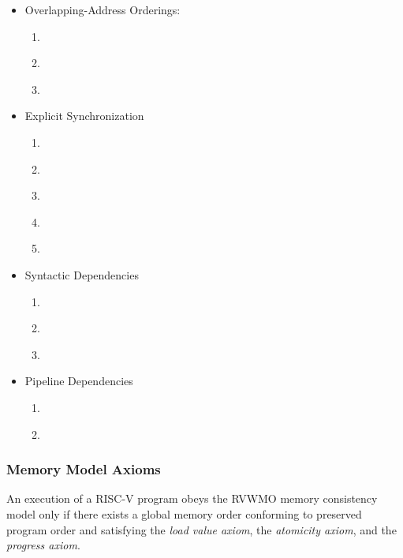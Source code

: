 \begin{itemize}
  \item Overlapping-Address Orderings:
    \begin{enumerate}
      \item\label{ppo:->st} \ppost
      \item\label{ppo:rdw} \ppordw
      \item\label{ppo:amoforward} \ppoamoforward
    \end{enumerate}
  \item Explicit Synchronization
    \begin{enumerate}[resume]
      \item\label{ppo:fence} \ppofence
      \item\label{ppo:acquire} \ppoacquire
      \item\label{ppo:release} \pporelease
      \item\label{ppo:rcsc} \pporcsc
      \item\label{ppo:pair} \ppopair
    \end{enumerate}
  \item Syntactic Dependencies
    \begin{enumerate}[resume]
      \item\label{ppo:addr} \ppoaddr
      \item\label{ppo:data} \ppodata
      \item\label{ppo:ctrl} \ppoctrl
    \end{enumerate}
  \item Pipeline Dependencies
    \begin{enumerate}[resume]
      \item\label{ppo:addrdatarfi} \ppoaddrdatarfi
      \item\label{ppo:addrpo} \ppoaddrpo
    \end{enumerate}
\end{itemize}

\subsubsection*{Memory Model Axioms}

An execution of a RISC-V program obeys the RVWMO memory consistency model only if there exists a global memory order conforming to preserved program order and satisfying the {\em load value axiom}, the {\em atomicity axiom}, and the {\em progress axiom}.

